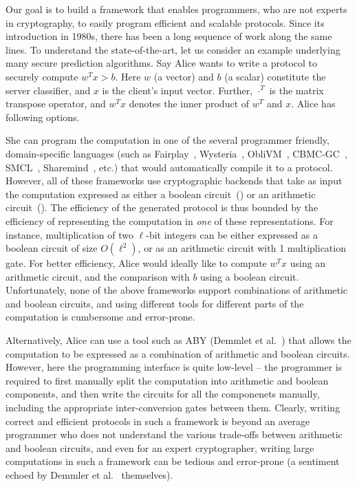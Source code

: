 Our goal is to build a framework that enables programmers, who are not
experts in cryptography, to easily program efficient and scalable \mpc
protocols. Since its introduction in 1980s, there has been a long
sequence of work along the same lines. To understand the
state-of-the-art, let us consider an example underlying many
secure prediction algorithms. Say Alice wants to write
a \mpc protocol to securely
compute $w^Tx >b$. Here $w$ (a vector) and $b$ (a scalar) constitute
the server classifier, and $x$ is the client's input vector. Further,
$\cdot^{T}$ is the matrix transpose operator, and $w^Tx$ denotes the
inner product of  $w^{T}$ and $x$. Alice has following options.


She can program the computation in one of the several programmer
friendly, domain-specific languages (such
as Fairplay~\cite{fairplay}, Wysteria~\cite{wysteria},
ObliVM~\cite{oblivm}, CBMC-GC~\cite{cbmcgc}, SMCL~\cite{smcl},
Sharemind~\cite{sharemind}, \cite{lambdaps} etc.) that would
automatically compile it to a \mpc protocol. However, all of these
frameworks use cryptographic backends that take as input
the computation expressed as either a boolean
circuit~(\cite{yao,gmw}) or an arithmetic circuit~(\cite{gentry}).
%
The efficiency of the generated \mpc protocol is thus bounded by the
efficiency of representing the computation in \emph{one} of
these representations. For instance, multiplication of two
$\ell$-bit integers can be either expressed as a boolean circuit of
size $O(\ell^2)$, or as an arithmetic circuit with 1 multiplication
gate.
%
For better efficiency, Alice would ideally like to compute
$w^Tx$ using an arithmetic circuit, and the comparison with $b$ using
a boolean circuit.
%
Unfortunately, none of the above frameworks support combinations of
arithmetic and boolean circuits, and using different tools for
different parts of the computation is cumbersome and error-prone.



Alternatively, Alice can use a tool such as ABY (Demmlet et
al.~\cite{aby}) that allows
the computation to be expressed as a combination of arithmetic and
boolean circuits. However, here the programming interface is quite
low-level -- the programmer is required to first manually split the
computation into arithmetic and boolean components, and then write the
circuits for all the componenets manually, including the appropriate
inter-conversion gates between them. Clearly, writing correct
and efficient protocols in such a framework is beyond an average
programmer who does not understand the various trade-offs between
arithmetic and boolean circuits, and even for an expert cryptographer,
writing large computations in such a framework can be tedious and
error-prone (a sentiment echoed by Demmler et al.~\cite{aby} themselves).

